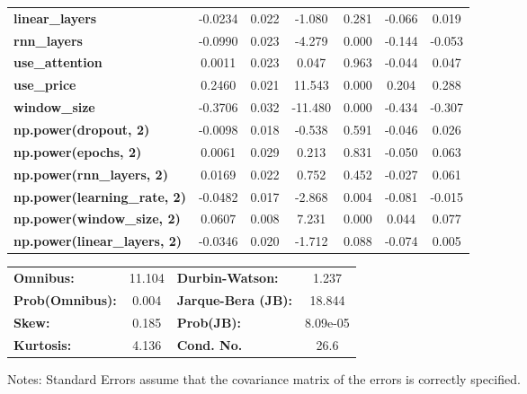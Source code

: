 \begin{center}
\begin{tabular}{lcccccc}
\textbf{linear\_layers}              &      -0.0234  &        0.022     &    -1.080  &         0.281        &       -0.066    &        0.019     \\
\textbf{rnn\_layers}                 &      -0.0990  &        0.023     &    -4.279  &         0.000        &       -0.144    &       -0.053     \\
\textbf{use\_attention}              &       0.0011  &        0.023     &     0.047  &         0.963        &       -0.044    &        0.047     \\
\textbf{use\_price}                  &       0.2460  &        0.021     &    11.543  &         0.000        &        0.204    &        0.288     \\
\textbf{window\_size}                &      -0.3706  &        0.032     &   -11.480  &         0.000        &       -0.434    &       -0.307     \\
\textbf{np.power(dropout, 2)}        &      -0.0098  &        0.018     &    -0.538  &         0.591        &       -0.046    &        0.026     \\
\textbf{np.power(epochs, 2)}         &       0.0061  &        0.029     &     0.213  &         0.831        &       -0.050    &        0.063     \\
\textbf{np.power(rnn\_layers, 2)}    &       0.0169  &        0.022     &     0.752  &         0.452        &       -0.027    &        0.061     \\
\textbf{np.power(learning\_rate, 2)} &      -0.0482  &        0.017     &    -2.868  &         0.004        &       -0.081    &       -0.015     \\
\textbf{np.power(window\_size, 2)}   &       0.0607  &        0.008     &     7.231  &         0.000        &        0.044    &        0.077     \\
\textbf{np.power(linear\_layers, 2)} &      -0.0346  &        0.020     &    -1.712  &         0.088        &       -0.074    &        0.005     \\
\bottomrule
\end{tabular}
\begin{tabular}{lclc}
\textbf{Omnibus:}       & 11.104 & \textbf{  Durbin-Watson:     } &    1.237  \\
\textbf{Prob(Omnibus):} &  0.004 & \textbf{  Jarque-Bera (JB):  } &   18.844  \\
\textbf{Skew:}          &  0.185 & \textbf{  Prob(JB):          } & 8.09e-05  \\
\textbf{Kurtosis:}      &  4.136 & \textbf{  Cond. No.          } &     26.6  \\
\bottomrule
\end{tabular}
\end{center}

Notes: \newline
 [1] Standard Errors assume that the covariance matrix of the errors is correctly specified.